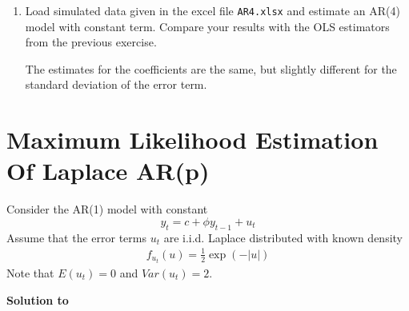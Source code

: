 \documentclass[a4paper]{scrartcl}
\begin{document}
\begin{enumerate}
\begin{enumerate}
		\begin{solution}~
			
		\end{solution}
		\item Load simulated data given in the excel file \texttt{AR4.xlsx} and estimate an AR(4) model with constant term. Compare your results with the OLS estimators from the previous exercise.
		\begin{solution}
		The estimates for the coefficients are the same, but slightly different for the standard deviation of the error term.
		
\newpage %
		\end{solution}
	\end{enumerate} 
\end{enumerate}
\newpage

\section[Maximum Likelihood Estimation Of Laplace AR(p)]{Maximum Likelihood Estimation Of Laplace AR(p)}\label{ex:MLARpLaPlace}
Consider the AR(1) model with constant
$$ y_t = c + \phi y_{t-1} + u_t$$
Assume that the error terms $u_t$ are i.i.d. Laplace distributed with known density
\begin{align*}
f_{u_{t}}(u)=\frac{1}{2}\exp \left( -|u|\right)
\end{align*}
Note that $E(u_t)=0$ and $Var(u_t)=2$.
\begin{solution}\textbf{Solution to }\end{solution}
\end{document}

